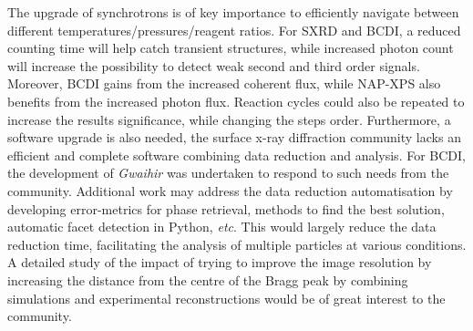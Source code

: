 The upgrade of synchrotrons is of key importance to efficiently navigate between different temperatures/pressures/reagent ratios.
For SXRD and BCDI, a reduced counting time will help catch transient structures, while increased photon count will increase the possibility to detect weak second and third order signals.
Moreover, BCDI gains from the increased coherent flux, while NAP-XPS also benefits from the increased photon flux.
Reaction cycles could also be repeated to increase the results significance, while changing the steps order.
Furthermore, a software upgrade is also needed, the surface x-ray diffraction community lacks an efficient and complete software combining data reduction and analysis.
For BCDI, the development of \textit{Gwaihir} was undertaken to respond to such needs from the community.
Additional work may address the data reduction automatisation by developing error-metrics for phase retrieval, methods to find the best solution, automatic facet detection in Python, \textit{etc}.
This would largely reduce the data reduction time, facilitating the analysis of multiple particles at various conditions.
A detailed study of the impact of trying to improve the image resolution by increasing the distance from the centre of the Bragg peak by combining simulations and experimental reconstructions would be of great interest to the community.